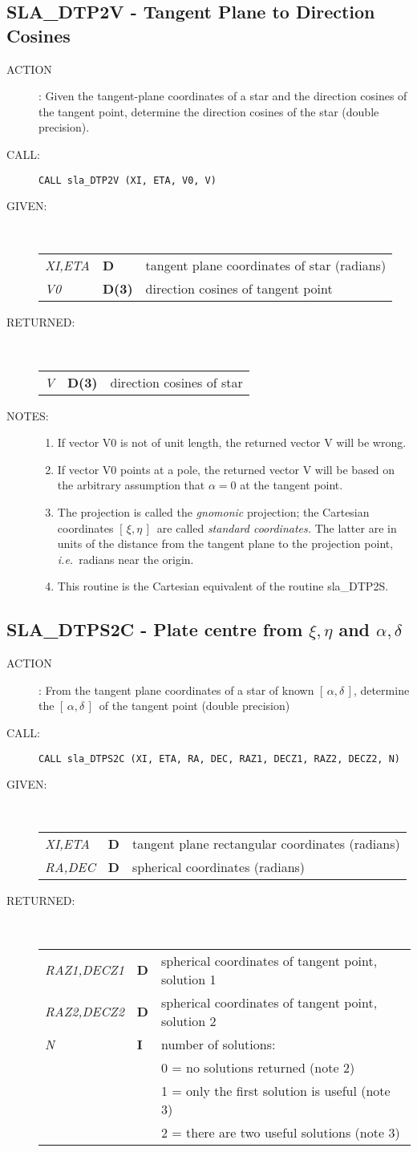 \documentclass[11pt,twoside]{article}
\newcommand{\xlabel}[1]{}
\newcommand{\radec}     {$[\,\alpha,\delta\,]$}
\newcommand{\xieta}     {$[\,\xi,\eta\,]$}
\newcommand{\routine}[3]
{\hbadness=10000
  \vbox
  {
    \rule{\textwidth}{0.3mm}\\
    {\Large {\bf #1} \hfill #2 \hfill {\bf #1}}\\
    \setlength{\oldspacing}{\topsep}
    \setlength{\topsep}{0.3ex}
    \begin{description}
      #3
    \end{description}
    \setlength{\topsep}{\oldspacing}
  }
}
\renewcommand{\routine}[3]
   {
      \subsection{#1\xlabel{#1} - #2\label{#1}}
       \begin{description}
         #3
       \end{description}
   }
\newcommand{\action}[1]
{\item[ACTION]: #1}
\newcommand{\action}[1]
   {\item[ACTION:] #1}
\newcommand{\call}[1]
{\item[CALL]: \hspace{0.4em}{\tt #1}}
\newlength{\oldspacing}
\renewcommand{\call}[1]
   {
    \item[CALL:] {\tt #1}
   }
\newcommand{\args}[2]
{
  \goodbreak
  \setlength{\oldspacing}{\topsep}
  \setlength{\topsep}{0.3ex}
  \begin{description}
  \item[#1]:\\[1.5ex]
    \begin{tabular}{p{7em}p{6em}p{22em}}
      #2
    \end{tabular}
  \end{description}
  \setlength{\topsep}{\oldspacing}
}
\renewcommand{\args}[2]
   {
     \begin{description}
        \item[#1:]\\
        \begin{tabular}{p{7em}p{6em}l}
           #2
        \end{tabular}
     \end{description}
   }
\newcommand{\spec}[3]
{
  {\em {#1}} & {\bf \mbox{#2}} & {#3}
}
\newcommand{\notes}[1]
{
  \goodbreak
  \setlength{\oldspacing}{\topsep}
  \setlength{\topsep}{0.3ex}
  \begin{description}
    \item[NOTES]:
        #1
  \end{description}
  \setlength{\topsep}{\oldspacing}
}
\renewcommand{\notes}[1]
   {
      \begin{description}
         \item[NOTES:]
            #1
      \end{description}
   }
\begin{document}
\routine{SLA\_DTP2V}{Tangent Plane to Direction Cosines}
{
 \action{Given the tangent-plane coordinates of a star and the direction
         cosines of the tangent point, determine the direction cosines
         of the star
         (double precision).}
 \call{CALL sla\_DTP2V (XI, ETA, V0, V)}
}
\args{GIVEN}
{
 \spec{XI,ETA}{D}{tangent plane coordinates of star (radians)} \\
 \spec{V0}{D(3)}{direction cosines of tangent point}
}
\args{RETURNED}
{
 \spec{V}{D(3)}{direction cosines of star}
}
\notes
{
 \begin{enumerate}
  \item If vector V0 is not of unit length, the returned vector V will
        be wrong.
  \item If vector V0 points at a pole, the returned vector V will be
        based on the arbitrary assumption that $\alpha=0$ at
        the tangent point.
  \item The projection is called the {\it gnomonic}\/ projection;  the
        Cartesian coordinates \xieta\ are called
        {\it standard coordinates.}\/  The latter
        are in units of the distance from the tangent plane to the projection
        point, {\it i.e.}\ radians near the origin.
  \item This routine is the Cartesian equivalent of the routine sla\_DTP2S.
 \end{enumerate}
}
\routine{SLA\_DTPS2C}{Plate centre from $\xi,\eta$ and $\alpha,\delta$}
{
 \action{From the tangent plane coordinates of a star of known \radec,
        determine the \radec\ of the tangent point (double precision)}
 \call{CALL sla\_DTPS2C (XI, ETA, RA, DEC, RAZ1, DECZ1, RAZ2, DECZ2, N)}
}
\args{GIVEN}
{
 \spec{XI,ETA}{D}{tangent plane rectangular coordinates (radians)} \\
 \spec{RA,DEC}{D}{spherical coordinates (radians)}
}
\args{RETURNED}
{
 \spec{RAZ1,DECZ1}{D}{spherical coordinates of tangent point,
                      solution 1} \\
 \spec{RAZ2,DECZ2}{D}{spherical coordinates of tangent point,
                      solution 2} \\
 \spec{N}{I}{number of solutions:} \\
 \spec{}{}{\hspace{1em} 0 = no solutions returned  (note 2)} \\
 \spec{}{}{\hspace{1em} 1 = only the first solution is useful (note 3)} \\
 \spec{}{}{\hspace{1em} 2 = there are two useful solutions (note 3)}
}
\end{document}
